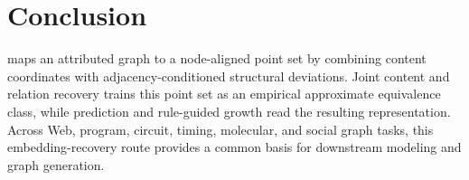 \section{Conclusion}
\label{sec:conclusion}

\method{} maps an attributed graph to a node-aligned point set by combining
content coordinates with adjacency-conditioned structural deviations.  Joint
content and relation recovery trains this point set as an empirical approximate
equivalence class, while prediction and rule-guided growth read the resulting
representation.  Across Web, program, circuit, timing, molecular, and social
graph tasks, this embedding-recovery route provides a common basis for
downstream modeling and graph generation.
